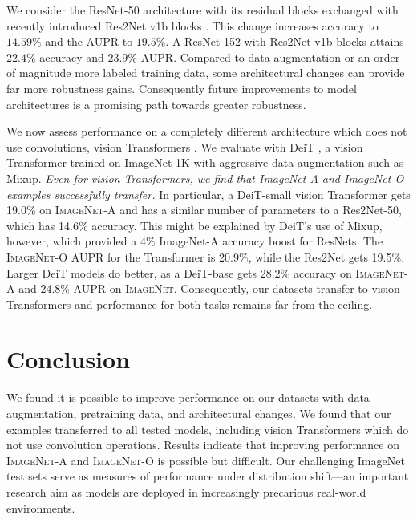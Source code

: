 \documentclass[10pt,twocolumn,letterpaper]{article}
\begin{document}
We consider the ResNet-50 architecture with its residual blocks exchanged with recently introduced Res2Net v1b blocks \cite{Gao2019Res2NetAN}. This change increases accuracy to $14.59\%$ and the AUPR to $19.5\%$. A ResNet-152 with Res2Net v1b blocks attains $22.4\%$ accuracy and $23.9\%$ AUPR. Compared to data augmentation or an order of magnitude more labeled training data, some architectural changes can provide far more robustness gains. Consequently future improvements to model architectures is a promising path towards greater robustness.

We now assess performance on a completely different architecture which does not use convolutions, vision Transformers \cite{Dosovitskiy2020AnII}.
We evaluate with DeiT \cite{touvron2020deit}, a vision Transformer trained on ImageNet-1K with aggressive data augmentation such as Mixup. \emph{Even for vision Transformers, we find that ImageNet-A and ImageNet-O examples successfully transfer.} In particular, a DeiT-small vision Transformer gets 19.0\% on \textsc{ImageNet-A} and has a similar number of parameters to a Res2Net-50, which has 14.6\% accuracy. This might be explained by DeiT's use of Mixup, however, which provided a 4\% ImageNet-A accuracy boost for ResNets. The \textsc{ImageNet-O} AUPR for the Transformer is 20.9\%, while the Res2Net gets 19.5\%. Larger DeiT models do better, as a DeiT-base gets 28.2\% accuracy on \textsc{ImageNet-A} and 24.8\% AUPR on \textsc{ImageNet}. Consequently, our datasets transfer to vision Transformers and performance for both tasks remains far from the ceiling. 
\section{Conclusion}


We found it is possible to improve performance on our datasets with data augmentation, pretraining data, and architectural changes. We found that our examples transferred to all tested models, including vision Transformers which do not use convolution operations. Results indicate that improving performance on \textsc{ImageNet-A} and \textsc{ImageNet-O} is possible but difficult. Our challenging ImageNet test sets serve as measures of performance under distribution shift---an important research aim as models are deployed in increasingly precarious real-world environments.





%
 
\newpage
{\small


}
\newpage
\end{document}
